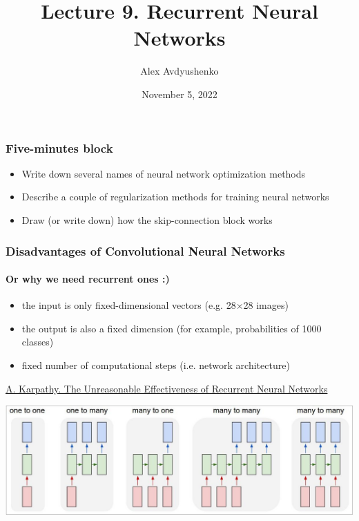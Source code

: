 \documentclass[fullscreen=true, bookmarks=true, hyperref={pdfencoding=unicode}]{beamer}
\title{Lecture 9. Recurrent Neural Networks}
\author{Alex Avdyushenko}
\institute{Kazakh-British Technical University}
\date{November 5, 2022}
\begin{document}

\begin{frame}
\transdissolve[duration=0.2]
\titlepage
\end{frame}


\begin{frame}
  \frametitle{Five-minutes block}
  \pause
  \begin{itemize}
     \item Write down several names of neural network optimization methods
     \item Describe a couple of regularization methods for training neural networks
     \item Draw (or write down) how the skip-connection block works
  \end{itemize}

\end{frame}


\begin{frame}
\frametitle{Disadvantages of Convolutional Neural Networks}
   \framesubtitle{Or why we need recurrent ones :)}
   \begin{itemize}
     \pause
     \item the input is only fixed-dimensional vectors (e.g. 28$\times$28 images)
     \pause
     \item the output is also a fixed dimension (for example, probabilities of 1000 classes)
     \pause
     \item fixed number of computational steps (i.e. network architecture)
   \end{itemize}

   \pause
   \vspace{1cm}
   \href{http://karpathy.github.io/2015/05/21/rnn-effectiveness/}{A. Karpathy. The Unreasonable Effectiveness of Recurrent Neural Networks}
   \begin{center}
     \includegraphics[keepaspectratio,
                      width=0.6\paperwidth]{rnn_architectures.jpg}
   \end{center}

\end{frame}
\end{document}
